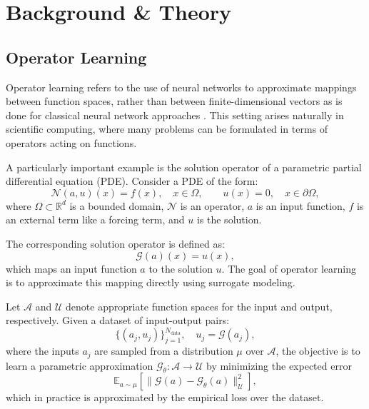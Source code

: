 \chapter{\label{cha:background}Background \& Theory}

\section{Operator Learning}\label{sec:operator-learning}

Operator learning refers to the use of neural networks to approximate mappings between function spaces, rather than between finite-dimensional vectors as is done for classical neural network approaches \cite{neural-operators}. This setting arises naturally in scientific computing, where many problems can be formulated in terms of operators acting on functions.

A particularly important example is the solution operator of a parametric partial differential equation (PDE). Consider a PDE of the form:
\begin{equation}
\mathcal{N}(a, u)(x) = f(x), \quad x \in \Omega, \qquad u(x) = 0, \quad x \in \partial \Omega,
\end{equation}
where $\Omega \subset \mathbb{R}^d$ is a bounded domain, $\mathcal{N}$ is an operator, $a$ is an input function, $f$ is an external term like a forcing term, and $u$ is the solution.

The corresponding solution operator is defined as:
\begin{equation}
\mathcal{G}(a)(x) = u(x),
\end{equation}
which maps an input function $a$ to the solution $u$. The goal of operator learning is to approximate this mapping directly using surrogate modeling. 

Let $\mathcal{A}$ and $\mathcal{U}$ denote appropriate function spaces for the input and output, respectively. Given a dataset of input-output pairs:
\begin{equation}
\{(a_j, u_j)\}_{j=1}^{N_{\text{data}}}, \quad u_j = \mathcal{G}(a_j),
\end{equation}
where the inputs $a_j$ are sampled from a distribution $\mu$ over $\mathcal{A}$, the objective is to learn a parametric approximation $\mathcal{G}_\theta : \mathcal{A} \to \mathcal{U}$ by minimizing the expected error
\begin{equation}
\mathbb{E}_{a \sim \mu} \left[ \| \mathcal{G}(a) - \mathcal{G}_\theta(a) \|_{\mathcal{U}}^2 \right],
\end{equation}
which in practice is approximated by the empirical loss over the dataset.

